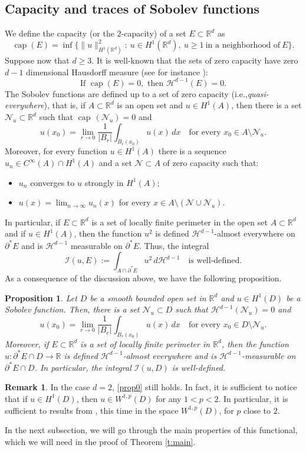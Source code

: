 \documentclass[11pt]{article}
\newcommand{\ie}{i.e.,\xspace}
\numberwithin{equation}{section}
\theoremstyle{plain}
\newtheorem{prop}[teo]{Proposition}
\theoremstyle{definition}
\newtheorem{oss}[teo]{Remark}
\let\ds\displaystyle
\def\R{\mathbb{R}}
\def\HH{\mathcal{H}}
\DeclareMathOperator{\cp}{cap}
\begin{document}
\subsection{Capacity and traces of Sobolev functions}
We define the capacity (or the $2$-capacity) of a set $E\subset\R^d$ as
\[\cp (E)=\inf\big\{\|u\|_{H^1(\R^d)}^2:\ u\in H^1(\R^d),\ u\ge 1\ \text{in a neighborhood of}\ E\big\}.\]
Suppose now that $d\ge 3$. It is well-known that the sets of zero capacity have zero $d-1$ dimensional Hausdorff measure (see for instance \cite[\S 4.7.2, Th.\,4]{eg}):
\[\text{If } \cp(E)=0,\text{ then } \HH^{d-1}(E)=0.\]
The Sobolev functions are defined up to a set of zero capacity (\ie {\it quasi-everywhere}), that is, if $A\subset \R^d$ is an open set and $u\in H^1(A)$, then there is a set $\mathcal N_u\subset\R^d$ such that $\cp\,(\mathcal N_u)=0$ and
\[u(x_0)=\lim_{r\to0}\frac1{|B_r|}\int_{B_r(x_0)}u(x)\,dx\quad\text{for every } x_0\in A\setminus \mathcal N_u.\]
Moreover, for every function $u\in H^1(A)$ there is a sequence $u_n\in C^\infty(A)\cap H^1(A)$ and a set $\mathcal N\subset A$ of zero capacity such that:
\begin{itemize}
\item $u_n$ converges to $u$ strongly in $H^1(A)$;
\item $u(x)=\lim_{n\to\infty}u_n(x)$ for every $x\in A\setminus(\mathcal N\cup\mathcal N_u)$.
\end{itemize}
In particular, if $E\subset\R^d$ is a set of locally finite perimeter in the open set $A\subset\R^d$ and if $u\in H^1(A)$, then the function $u^2$ is defined $\HH^{d-1}$-almost everywhere on $\partial^\ast E$ and is $\HH^{d-1}$ measurable on $\partial^\ast E$. Thus, the integral
\[\mathcal I(u,E):=\int_{A\cap \partial^\ast E}u^2\,d\HH^{d-1}\quad\text{is well-defined}.\]
As a consequence of the discussion above, we have the following proposition.
\begin{prop}\label{prop0}
Let $D$ be a smooth bounded open set in $\R^d$ and $u\in H^1(D)$ be a Sobolev function. Then, there is a set $\mathcal N_u\subset D$ such that $\HH^{d-1}(\mathcal N_u)=0$ and \[u(x_0)=\lim_{r\to0}\frac1{|B_r|}\int_{B_r(x_0)}u(x)\,dx\quad\text{for every } x_0\in D\setminus \mathcal N_u.\]
Moreover, if $E\subset\R^d$ is a set of locally finite perimeter in $\R^d$, then the function $u:\partial^\ast E\cap D\to\R$ is defined $\HH^{d-1}$-almost everywhere and is $\HH^{d-1}$-measurable on $\partial^\ast E\cap D$. In particular, the integral
$\ds \mathcal I(u,D)$ is well-defined.
\end{prop}
\begin{oss}
In the case $d=2$, \eqref{prop0} still holds. In fact, it is sufficient to notice that if $u\in H^1(D)$, then $u\in W^{1,p}(D)$ for any $1<p<2$. In particular, it is sufficient to results from \cite{eg}, this time in the space $W^{1,p}(D)$, for $p$ close to $2$.
\end{oss}
In the next subsection, we will go through the main properties of this functional, which we will need in the proof of Theorem \ref{t:main}.
\end{document}
